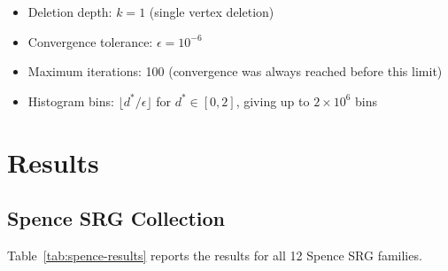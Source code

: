 \documentclass[11pt,a4paper]{article}
\begin{document}
\begin{itemize}
    \item Deletion depth: $k = 1$ (single vertex deletion)
    \item Convergence tolerance: $\epsilon = 10^{-6}$
    \item Maximum iterations: 100 (convergence was always reached before this limit)
    \item Histogram bins: $\lfloor d^* / \epsilon \rfloor$ for $d^* \in [0, 2]$, giving up to $2 \times 10^6$ bins
\end{itemize}


\section{Results}
\label{sec:results}

\subsection{Spence SRG Collection}

Table~\ref{tab:spence-results} reports the results for all 12 Spence SRG families.
\end{document}
